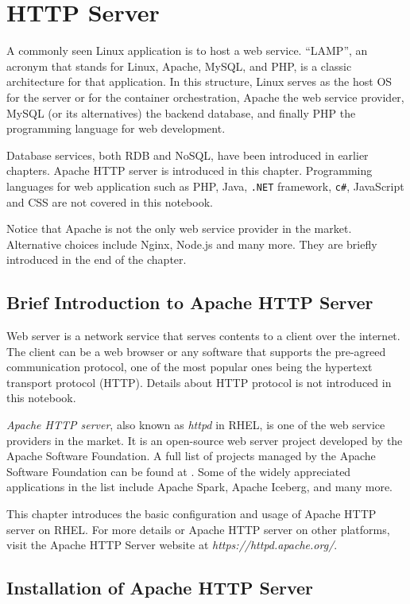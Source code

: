 \chapter{HTTP Server}

A commonly seen Linux application is to host a web service. ``LAMP'', an acronym that stands for Linux, Apache, MySQL, and PHP, is a classic architecture for that application. In this structure, Linux serves as the host OS for the server or for the container orchestration, Apache the web service provider, MySQL (or its alternatives) the backend database, and finally PHP the programming language for web development.

Database services, both RDB and NoSQL, have been introduced in earlier chapters. Apache HTTP server is introduced in this chapter. Programming languages for web application such as PHP, Java, \verb|.NET| framework, \verb|c#|, JavaScript and CSS are not covered in this notebook.

Notice that Apache is not the only web service provider in the market. Alternative choices include Nginx, Node.js and many more. They are briefly introduced in the end of the chapter.

\section{Brief Introduction to Apache HTTP Server}

Web server is a network service that serves contents to a client over the internet. The client can be a web browser or any software that supports the pre-agreed communication protocol, one of the most popular ones being the hypertext transport protocol (HTTP). Details about HTTP protocol is not introduced in this notebook.

\textit{Apache HTTP server}, also known as \textit{httpd} in RHEL, is one of the web service providers in the market. It is an open-source web server project developed by the Apache Software Foundation. A full list of projects managed by the Apache Software Foundation can be found at \cite{apache2024projects}. Some of the widely appreciated applications in the list include Apache Spark, Apache Iceberg, and many more.

This chapter introduces the basic configuration and usage of Apache HTTP server on RHEL. For more details or Apache HTTP server on other platforms, visit the Apache HTTP Server website at \textit{https://httpd.apache.org/}. 

\section{Installation of Apache HTTP Server}

